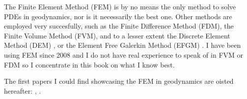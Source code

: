 The Finite Element Method (FEM) is by no means the only method 
to solve PDEs in geodynamics, nor is it necessarily the best one.
Other methods are employed very succesfully, such as the Finite Difference 
Method (FDM), the Finite Volume Method (FVM), and to a lesser extent
the Discrete Element Method (DEM) \cite{egho07,egsc07,funi14}, 
or the Element Free Galerkin Method (EFGM) \cite{hans03}.
I have been using FEM since 2008 and I do not have real 
experience to speak of in FVM or FDM so I concentrate in this book 
on what I know best. 

The first papers I could find showcasing the FEM in geodynamics are oisted hereafter:
\cite{gart78}, 
\cite{anbr80}
\cite{engl82}
\cite{baum85}
\cite{enho86}
\cite{zupa86}
\cite{zupf86}
\cite{brau93}
\cite{brau94}
\cite{brbe95}
\cite{yowo95}
\cite{dusa96}.

